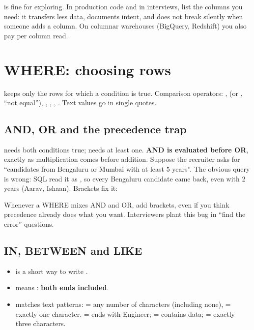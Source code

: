 \begin{trap}
 is fine for exploring. In production code and in interviews, list the columns you need: it transfers less data, documents intent, and
does not break silently when someone adds a column. On columnar warehouses (BigQuery, Redshift) you also pay per column read.
\end{trap}

\section{WHERE: choosing rows}
 keeps only the rows for which a condition is true. Comparison operators: \code{=}, \code{<>} (or \code{!=}, ``not equal''), \code{<},
\code{<=}, \code{>}, \code{>=}. Text values go in single quotes.

\subsection{AND, OR and the precedence trap}
 needs both conditions true;  needs at least one. \textbf{AND is evaluated before OR}, exactly as multiplication comes before addition.
Suppose the recruiter asks for ``candidates from Bengaluru or Mumbai with at least 5 years''. The obvious query is wrong:
SQL read it as , so every Bengaluru candidate came back, even with 2 years (Aarav,
Ishaan). Brackets fix it:
\begin{recap}
Whenever a WHERE mixes AND and OR, add brackets, even if you think precedence already does what you want. Interviewers plant this bug in ``find the error''
questions.
\end{recap}

\subsection{IN, BETWEEN and LIKE}
\begin{itemize}
\item {} is a short way to write .
\item {} means : \textbf{both ends included}.
\item {} matches text patterns: \code{\%} = any number of characters (including none), \code{\_} = exactly one character.
 = ends with Engineer;  = contains data;  = exactly three characters.
\end{itemize}

